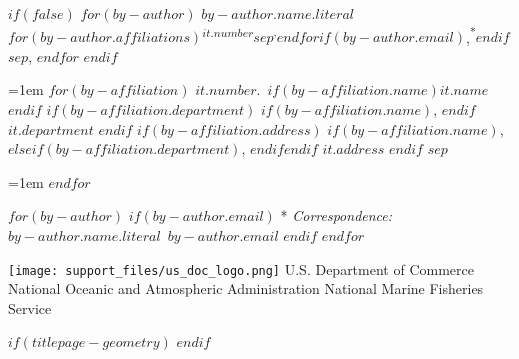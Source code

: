 \begin{minipage}[b][\textheight][s]{\textwidth}
$if(false)$
  $for(by-author)$
    {$by-author.name.literal$}$for(by-author.affiliations)${\textsuperscript{$it.number$}}$sep${\textsuperscript{,}}$endfor$$if(by-author.email)$,{\textsuperscript{*}}$endif$$sep$,
$endfor$
$endif$

\vspace{2\baselineskip}

\hangindent=1em
$for(by-affiliation)$%
{$it.number$}.~$if(by-affiliation.name)${$it.name$}$endif$%
$if(by-affiliation.department)$%
$if(by-affiliation.name)$, $endif$%
{$it.department$}%
$endif$%
$if(by-affiliation.address)$%
$if(by-affiliation.name)$, $else$$if(by-affiliation.department)$, $endif$$endif$%
{$it.address$}%
$endif$%
$sep$\par\hangindent=1em%
$endfor$

\vspace{1\baselineskip}

$for(by-author)$
$if(by-author.email)$
* \textit{Correspondence:}~$by-author.name.literal$~$by-author.email$
$endif$
$endfor$


\vfill


\vspace{1\baselineskip}


\texttt{[image: support\_files/us\_doc\_logo.png]}\newline %
U.S. Department of Commerce\newline
National Oceanic and Atmospheric Administration\newline
National Marine Fisheries Service\newline

\end{minipage}
$if(titlepage-geometry)$
\restoregeometry
$endif$
